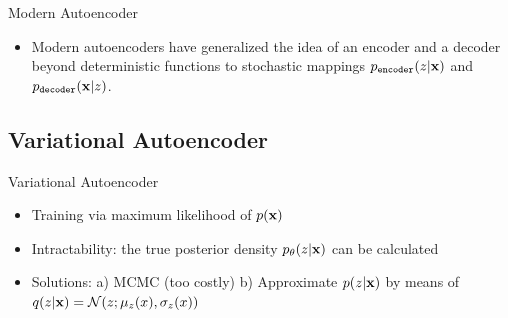 \documentclass[xcolor=pdftex,dvipsnames,table,mathserif]{beamer}
\begin{document}


\begin{frame}{Modern Autoencoder}
\begin{itemize}
\item Modern autoencoders have generalized the idea of an encoder and a decoder
beyond deterministic functions to stochastic mappings
$p_{\texttt{encoder}}(z|\mathbf{x})$ and $p_{\texttt{decoder}}(\mathbf{x}|z)$.
\end{itemize}
\end{frame}


\subsection{Variational Autoencoder}

\begin{frame}{Variational Autoencoder}
\begin{figure}
\centering
{}
\end{figure}
\begin{itemize}
\item Training via maximum likelihood of $p(\mathbf{x})$
\item Intractability: the true posterior density $p_{\theta}(z|\mathbf{x})$ can be calculated %
\item Solutions: a) MCMC (too costly) b) Approximate $p(z|\mathbf{x})$ by means of $q(z|\mathbf{x})=\mathcal{N}(z; \mu_{z}(x),\sigma_{z}(x))$
\end{itemize}
\end{frame}
\end{document}

